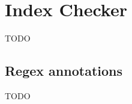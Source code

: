 \chapter{Index Checker\label{index-checker}}
TODO
\section{Regex annotations\label{regex-annotations}}
TODO
